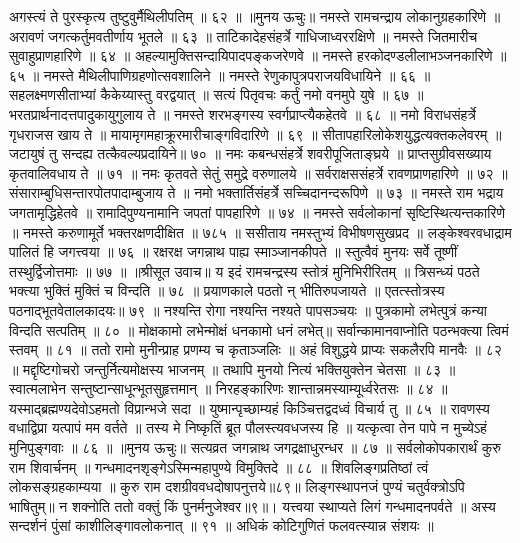 अगस्त्यं ते पुरस्कृत्य तुष्टुवुर्मैथिलीपतिम् ॥ ६२ ॥
॥मुनय ऊचुः॥
नमस्ते रामचन्द्राय लोकानुग्रहकारिणे ॥
अरावणं जगत्कर्तुमवतीर्णाय भूतले ॥ ६३ ॥
ताटिकादेहसंहर्त्रे गाधिजाध्वररक्षिणे ॥
नमस्ते जितमारीच सुवाहुप्राणहारिणे ॥ ६४ ॥
अहल्यामुक्तिसन्दायिपादपङ्कजरेणवे ॥
नमस्ते हरकोदण्डलीलाभञ्जनकारिणे ॥ ६५ ॥
नमस्ते मैथिलीपाणिग्रहणोत्सवशालिने ॥
नमस्ते रेणुकापुत्रपराजयविधायिने ॥ ६६ ॥
सहलक्ष्मणसीताभ्यां कैकेय्यास्तु वरद्वयात् ॥
सत्यं पितृवचः कर्तुं नमो वनमुपे युषे ॥ ६७ ॥
भरतप्रार्थनादत्तपादुकायुगुलाय ते ॥
नमस्ते शरभङ्गस्य स्वर्गप्राप्त्यैकहेतवे ॥ ६८ ॥
नमो विराधसंहर्त्रे गृधराजस खाय ते ॥
मायामृगमहाक्रूरमारीचाङ्गविदारिणे ॥ ६९ ॥
सीतापहारिलोकेशयुद्धत्यक्तकलेवरम् ॥
जटायुषं तु सन्दह्य तत्कैवल्यप्रदायिने॥ ७० ॥
नमः कबन्धसंहर्त्रे शवरीपूजिताङ्घ्रये ॥
प्राप्तसुग्रीवसख्याय कृतवालिवधाय ते ॥ ७१ ॥
नमः कृतवते सेतुं समुद्रे वरुणालये ॥
सर्वराक्षससंहर्त्रे रावणप्राणहारिणे ॥ ७२ ॥
संसाराम्बुधिसन्तारपोतपादाम्बुजाय ते ॥
नमो भक्तार्तिसंहर्त्रे सच्चिदानन्दरूपिणे ॥ ७३ ॥
नमस्ते राम भद्राय जगतामृद्धिहेतवे ॥
रामादिपुण्यनामानि जपतां पापहारिणे ॥ ७४ ॥
नमस्ते सर्वलोकानां सृष्टिस्थित्यन्तकारिणे ॥
नमस्ते करुणामूर्ते भक्तरक्षणदीक्षित ॥ ७८५ ॥
ससीताय नमस्तुभ्यं विभीषणसुखप्रद ॥
लङ्केश्वरवधाद्राम पालितं हि जगत्त्वया ॥ ७६ ॥
रक्षरक्ष जगन्नाथ पाह्य स्माञ्जानकीपते ॥
स्तुत्वैवं मुनयः सर्वे तूष्णीं तस्थुर्द्विजोत्तमाः ॥ ७७ ॥
॥श्रीसूत उवाच॥
य इदं रामचन्द्रस्य स्तोत्रं मुनिभिरीरितम् ॥
त्रिसन्ध्यं पठते भक्त्या भुक्तिं मुक्तिं च विन्दति ॥ ७८ ॥
प्रयाणकाले पठतो न् भीतिरुपजायते ॥
एतत्स्तोत्रस्य पठनाद्भूतवेतालकादयः॥ ७९ ॥
नश्यन्ति रोगा नश्यन्ति नश्यते पापसञ्चयः ॥
पुत्रकामो लभेत्पुत्रं कन्या विन्दति सत्पतिम् ॥ ८० ॥
मोक्षकामो लभेन्मोक्षं धनकामो धनं लभेत्॥
सर्वान्कामानवाप्नोति पठन्भक्त्या त्विमं स्तवम् ॥ ८१ ॥
ततो रामो मुनीन्प्राह प्रणम्य च कृताञ्जलिः ॥
अहं विशुद्धये प्राप्यः सकलैरपि मानवैः ॥ ८२ ॥
मद्दृष्टिगोचरो जन्तुर्नित्यमोक्षस्य भाजनम् ॥
तथापि मुनयो नित्यं भक्तियुक्तेन चेतसा ॥ ८३ ॥
स्वात्मलाभेन सन्तुष्टान्साधून्भूतसुहृत्तमान् ॥
निरहङ्कारिणः शान्तान्नमस्याम्यूर्ध्वरेतसः ॥ ८४ ॥
यस्माद्ब्रह्मण्यदेवोऽहमतो विप्रान्भजे सदा ॥
युष्मान्पृच्छाम्यहं किञ्चित्तद्वदध्वं विचार्य तु ॥ ८५ ॥
रावणस्य वधाद्विप्रा यत्पापं मम वर्तते ॥
तस्य मे निष्कृतिं ब्रूत पौलस्त्यवधजस्य हि ॥
यत्कृत्वा तेन पापे न मुच्येऽहं मुनिपुङ्गवाः ॥ ८६ ॥
॥मुनय ऊचुः॥
सत्यव्रत जगन्नाथ जगद्रक्षाधुरन्धर ॥ ८७ ॥
सर्वलोकोपकारार्थं कुरु राम शिवार्चनम् ॥
गन्धमादनशृङ्गेऽस्मिन्महापुण्ये विमुक्तिदे ॥ ८८ ॥
शिवलिङ्गप्रतिष्ठां त्वं लोकसङ्ग्रहकाम्यया ॥
कुरु राम दशग्रीववधदोषापनुत्तये॥८९॥
लिङ्गस्थापनजं पुण्यं चतुर्वक्त्रोऽपि भाषितुम्॥
न शक्नोति ततो वक्तुं किं पुनर्मनुजेश्वर॥९॥।
यत्त्वया स्थाप्यते लिगं गन्धमादनपर्वते ॥
अस्य सन्दर्शनं पुंसां काशीलिङ्गावलोकनात् ॥ ९१ ॥
अधिकं कोटिगुणितं फलवत्स्यान्न संशयः ॥
